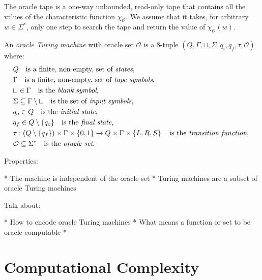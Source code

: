 {\color{red} The oracle tape is a one-way unbounded, read-only tape that contains all the values of the characteristic function $\chi_\mathcal{O}$. We assume that it takes, for arbitrary $w \in \Sigma^\ast$, only one step to search the tape and return the value of $\chi_\mathcal{O}(w)$.}

\begin{definition}
\label{def:Oracle-Turing-Machine}
An \emph{oracle Turing machine} with oracle set $\mathcal{O}$ is a 8-tuple $\left(Q, \Gamma, \sqcup, \Sigma, q_i, q_f, \tau, \mathcal{O} \right)$ where:
\begin{align*}
 & Q \quad \text{is a finite, non-empty, set of \emph{states},} \index{Machine State} \\
 & \Gamma \quad \text{is a finite, non-empty, set of \emph{tape symbols},} \index{Tape Symbol} \\
 & \sqcup\in\Gamma \quad \text{is the \emph{blank symbol},} \index{Blank Symbol} \\
 & \Sigma\subseteq\Gamma\setminus\sqcup \quad \text{is the set of \emph{input symbols},}  \index{Input Symbol} \\
 & q_{o}\in Q \quad \text{is the \emph{initial state},} \index{Initial State} \\
 & q_{f}\in Q \setminus \{q_o\} \quad \text{is the \emph{final state},} \index{Final State} \\ 
 & \tau: \left(Q \setminus \{q_{f}\}\right) \times \Gamma \times \{0, 1\} \rightarrow  Q\times\Gamma\times\left\{ L,R,S\right\} \quad\text{is the \emph{transition function}, \index{Transition Function} } \\
 & \mathcal{O} \subseteq \Sigma^\ast \quad \text{is the \emph{oracle set}.}
\end{align*}
\end{definition}

Properties:

 * The machine is independent of the oracle set
 * Turing machines are a subset of oracle Turing machines

Talk about:

 * How to encode oracle Turing machines
 * What means a function or set to be oracle computable
 * 

%
%

\section{Computational Complexity}
\label{sec:computational_complexity}

